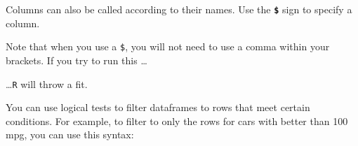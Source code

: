 \documentclass[
]{book}
\newenvironment{Shaded}{\begin{snugshade}}{\end{snugshade}}
\newcommand{\DecValTok}[1]{\textcolor[rgb]{0.00,0.00,0.81}{#1}}
\newcommand{\NormalTok}[1]{#1}
\newcommand{\SpecialCharTok}[1]{\textcolor[rgb]{0.00,0.00,0.00}{#1}}
\begin{document}
Columns can also be called according to their names. Use the \textbf{\texttt{\$}} sign to specify a column.

\begin{Shaded}
\end{Shaded}

Note that when you use a \texttt{\$}, you will not need to use a comma within your brackets. If you try to run this \ldots{}

\begin{Shaded}
\end{Shaded}

\ldots{}\texttt{R} will throw a fit.

You can use logical tests to filter dataframes to rows that meet certain conditions. For example, to filter to only the rows for cars with better than 100 mpg, you can use this syntax:
\end{document}
